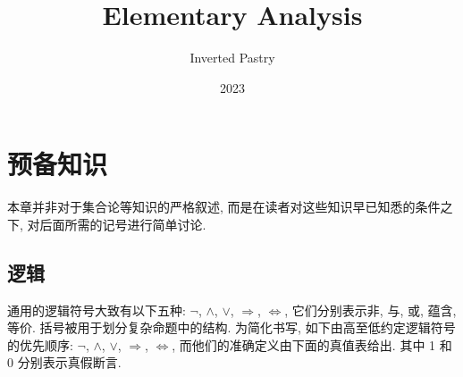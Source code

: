 \documentclass{ctexbook}
\title{Elementary Analysis}
\author{Inverted Pastry}
\date{2023}
\theoremstyle{definition}
\theoremstyle{remark}
\begin{document}
\frontmatter
\maketitle
\tableofcontents

\mainmatter

\chapter{预备知识}

本章并非对于集合论等知识的严格叙述, 而是在读者对这些知识早已知悉的条件之下, 对后面所需的记号进行简单讨论.

\section{逻辑}

通用的逻辑符号大致有以下五种: $\neg$, $\wedge$, $\vee$, $\Rightarrow$, $\Leftrightarrow$, 它们分别表示非, 与, 或, 蕴含, 等价. 括号被用于划分复杂命题中的结构. 为简化书写, 如下由高至低约定逻辑符号的优先顺序: $\neg$, $\wedge$, $\vee$, $\Rightarrow$, $\Leftrightarrow$, 而他们的准确定义由下面的真值表给出. 其中 1 和 0 分别表示真假断言.
\end{document}
